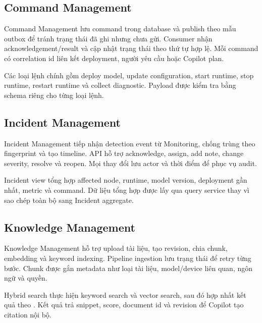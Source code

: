 \subsection{Command Management}

Command Management lưu command trong database và publish theo mẫu outbox để
tránh trạng thái đã ghi nhưng chưa gửi. Consumer nhận acknowledgement/result và
cập nhật trạng thái theo thứ tự hợp lệ. Mỗi command có correlation id liên kết
deployment, người yêu cầu hoặc Copilot plan.

Các loại lệnh chính gồm deploy model, update configuration, start runtime, stop
runtime, restart runtime và collect diagnostic. Payload được kiểm tra bằng schema
riêng cho từng loại lệnh.

\subsection{Incident Management}

Incident Management tiếp nhận detection event từ Monitoring, chống trùng theo
fingerprint và tạo timeline. API hỗ trợ acknowledge, assign, add note, change
severity, resolve và reopen. Mọi thay đổi lưu actor và thời điểm để phục vụ audit.

Incident view tổng hợp affected node, runtime, model version, deployment gần
nhất, metric và command. Dữ liệu tổng hợp được lấy qua query service thay vì sao
chép toàn bộ sang Incident aggregate.

\subsection{Knowledge Management}

Knowledge Management hỗ trợ upload tài liệu, tạo revision, chia chunk, embedding
và keyword indexing. Pipeline ingestion lưu trạng thái để retry từng bước. Chunk
được gắn metadata như loại tài liệu, model/device liên quan, ngôn ngữ và quyền.

Hybrid search thực hiện keyword search và vector search, sau đó hợp nhất kết quả
theo . Kết quả trả snippet, score, document id và
revision để Copilot tạo citation nội bộ.